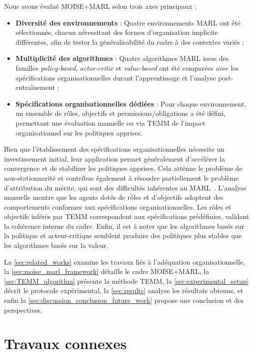 \documentclass[francais,ROIA,Unicode,manuscript]{cedram}
\begin{document}
\noindent
Nous avons évalué MOISE+MARL selon trois axes principaux :
%
\begin{itemize}
    \item \textbf{Diversité des environnements} : Quatre environnements MARL ont été sélectionnés, chacun nécessitant des formes d’organisation implicite différentes, afin de tester la généralisabilité du cadre à des contextes variés ;
    \item \textbf{Multiplicité des algorithmes} : Quatre algorithmes MARL issus des familles \textit{policy-based}, \textit{actor-critic} et \textit{value-based} ont été comparées avec les spécifications organisationnelles durant l’apprentissage et l’analyse post-entraînement ;
    \item \textbf{Spécifications organisationnelles dédiées} : Pour chaque environnement, un ensemble de rôles, objectifs et permissions/obligations a été défini, permettant une évaluation manuelle ou via TEMM de l’impact organisationnel sur les politiques apprises.
\end{itemize}
%
Bien que l’établissement des spécifications organisationnelles nécessite un investissement initial, leur application permet généralement d’accélérer la convergence et de stabiliser les politiques apprises. Cela atténue le problème de non-stationnarité et contribue également à résoudre partiellement le problème d’attribution du mérite, qui sont des difficultés inhérentes au MARL~\cite{Albrecht2024book}.
L’analyse manuelle montre que les agents dotés de rôles et d'objectifs adoptent des comportements conformes aux spécifications organisationnelles. Les rôles et objectifs inférés par TEMM correspondent aux spécifications prédéfinies, validant la cohérence interne du cadre.  Enfin, il est à noter que les algorithmes basés sur la politique et acteur-critique semblent produire des politiques plus stables que les algorithmes basés sur la valeur.

\noindent La \autoref{sec:related_works} examine les travaux liés à l'adéquation organisationnelle, la \autoref{sec:moise_marl_framework} détaille le cadre MOISE+MARL, la \autoref{sec:TEMM_algorithm} présente la méthode TEMM, la \autoref{sec:experimental_setup} décrit le protocole expérimental, la \autoref{sec:results} analyse les résultats obtenus, et enfin la \autoref{sec:discussion_conclusion_future_work} propose une conclusion et des perspectives.

\section{Travaux connexes}
\label{sec:related_works}
\end{document}
